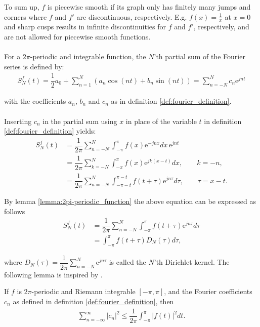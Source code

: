To sum up, $f$ is piecewise smooth if its graph only has finitely many jumps and corners where $f$ and $f'$ are discontinuous, respectively. E.g. $f(x) = \frac{1}{x}$ at $x = 0$ and sharp cusps results in infinite discontinuities for $f$ and $f'$, respectively, and are not allowed for piecewise smooth functions.
\\ \\
For a $2\pi$-periodic and integrable function, the $N$'th partial sum of the Fourier series is defined by:
\begin{align}\label{eq:partialsumFourierSeries}
	S_N^f(t) = \dfrac{1}{2} a_0 + \sum_{n=1}^N\left(a_n \cos(n 		t) + b_n \sin(n t) \right) = \sum_{n=-N}^N c_n \text{e}^{j n t}
\end{align}

with the coefficients $a_n$, $b_n$ and $c_n$ as in definition \ref{def:fourier_definition}.
\\ \\
Inserting $c_n$ in the partial sum using $x$ in place of the variable $t$ in definition \ref{def:fourier_definition} yields:
\begin{align*}
	S_N^f(t)
	&= \dfrac{1}{2\pi}\sum_{n=-N}^N \int_{-\pi}^\pi f(x) 			\text{e}^{-j n x} dx\, \text{e}^{j n t} \\
	&= \dfrac{1}{2\pi}\sum_{k = -N}^N \int_{-\pi}^\pi f(x) 			\text{e}^{j k (x-t)} dx, \quad \quad k = -n, \\
	&= \dfrac{1}{2\pi} \sum_{n = -N}^N \int_{-\pi - t}^{\pi - 		t} f(t + \tau ) \text{e}^{j n \tau} d\tau, \quad \quad \tau 	= x-t.
\end{align*}

By lemma \ref{lemma:2pi-periodic_function} the above equation can be expressed as follows
\begin{align} \label{eq:dirichlet}
	S_N^f (t) 
	&= \dfrac{1}{2\pi} \sum_{n=-N}^N \int_{-\pi}^\pi f(t + 			\tau) \text{e}^{j n \tau} d\tau \nonumber \\
	&= \int_{-\pi}^\pi f(t + \tau) D_N(\tau) d\tau,
\end{align}

where $D_N(\tau) = \dfrac{1}{2\pi}\sum_{n=-N}^{N}\text{e}^{j n \tau}$ is called the $N$'th Dirichlet kernel. The following lemma is inspired by \cite{page 30, FAA}.

\begin{lemma} \label{lemma:Bessel1}
If $f$ is $2\pi$-periodic and Riemann integrable $[-\pi,\pi]$, and the Fourier coefficients $c_n$ as defined in definition \ref{def:fourier_definition}, then
\begin{align*}
\sum_{n=-\infty}^\infty |c_n|^2 \leq \dfrac{1}{2\pi} \int_{-\pi}^\pi |f(t)|^2 dt.
\end{align*}
\end{lemma}

